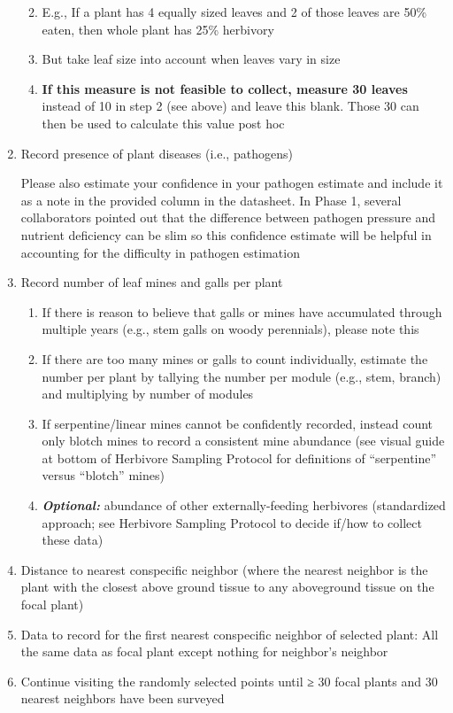 \documentclass[
  letterpaper,
  oneside,
  open=any]{scrbook}
\begin{document}
\begin{enumerate}
  \begin{enumerate}
  \def\labelenumii{\alph{enumii}.}
  \item
    E.g., If a plant has 4 equally sized leaves and 2 of those leaves
    are 50\% eaten, then whole plant has 25\% herbivory
  \item
    But take leaf size into account when leaves vary in size
  \item
    \textbf{If this measure is not feasible to collect, measure 30
    leaves} instead of 10 in step 2 (see above) and leave this blank.
    Those 30 can then be used to calculate this value post hoc
  \end{enumerate}
\item
  Record presence of plant diseases (i.e., pathogens)

  Please also estimate your confidence in your pathogen estimate and
  include it as a note in the provided column in the datasheet. In Phase
  1, several collaborators pointed out that the difference between
  pathogen pressure and nutrient deficiency can be slim so this
  confidence estimate will be helpful in accounting for the difficulty
  in pathogen estimation
\item
  Record number of leaf mines and galls per plant

  \begin{enumerate}
  \def\labelenumii{\alph{enumii}.}
  \item
    If there is reason to believe that galls or mines have accumulated
    through multiple years (e.g., stem galls on woody perennials),
    please note this
  \item
    If there are too many mines or galls to count individually, estimate
    the number per plant by tallying the number per module (e.g., stem,
    branch) and multiplying by number of modules
  \item
    If serpentine/linear mines cannot be confidently recorded, instead
    count only blotch mines to record a consistent mine abundance (see
    visual guide at bottom of Herbivore Sampling Protocol for
    definitions of ``serpentine'' versus ``blotch'' mines)
  \item
    \textbf{\emph{Optional:}} abundance of other externally-feeding
    herbivores (standardized approach; see Herbivore Sampling Protocol
    to decide if/how to collect these data)
  \end{enumerate}
\item
  Distance to nearest conspecific neighbor (where the nearest neighbor
  is the plant with the closest above ground tissue to any aboveground
  tissue on the focal plant)
\item
  Data to record for the first nearest conspecific neighbor of selected
  plant: All the same data as focal plant except nothing for neighbor's
  neighbor
\item
  Continue visiting the randomly selected points until ≥ 30 focal plants
  and 30 nearest neighbors have been surveyed
\end{enumerate}
\end{document}
